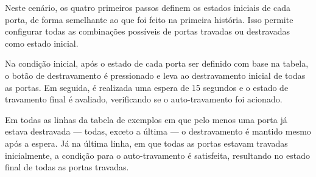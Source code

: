 Neste cenário, os quatro primeiros passos definem os estados iniciais de cada porta, de forma semelhante ao que foi feito na primeira história. Isso permite configurar 
todas as combinações possíveis de portas travadas ou destravadas como estado inicial.

Na condição inicial, após o estado de cada porta ser definido com base na tabela, o botão de destravamento é pressionado e leva ao destravamento inicial de todas as 
portas. Em seguida, é realizada uma espera de 15 segundos e o estado de travamento final é avaliado,  verificando se o auto-travamento foi acionado.

Em todas as linhas da tabela de exemplos em que pelo menos uma porta já estava destravada — todas, exceto a última — o destravamento é mantido mesmo após a espera. 
Já na última linha, em que todas as portas estavam travadas inicialmente, a condição para o auto-travamento é satisfeita, resultando no estado final de todas as 
portas travadas.
